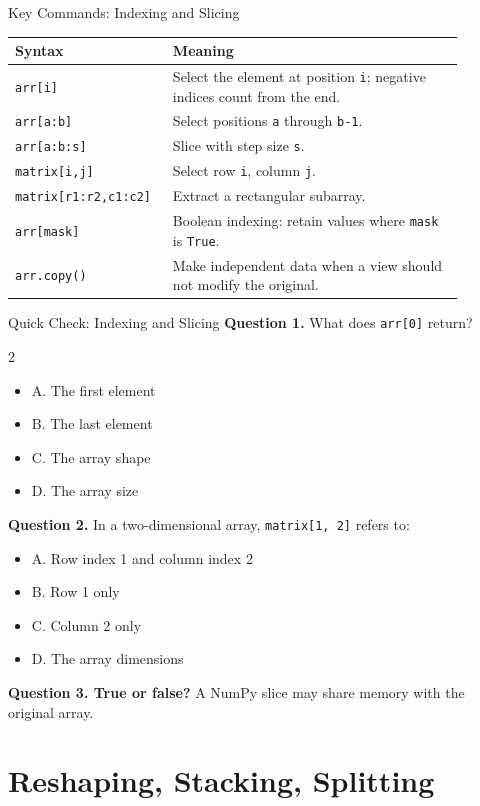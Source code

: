 \documentclass[aspectratio=169,11pt]{beamer}
\newcommand{\quiztitle}[1]{\textbf{\textcolor{QuizOrange}{#1}}}
\begin{document}
\begin{frame}{Key Commands: Indexing and Slicing}
\small
\begin{tabular}{p{0.28\linewidth}p{0.61\linewidth}}
\toprule
\textbf{Syntax} & \textbf{Meaning} \\
\midrule
\texttt{arr[i]} & Select the element at position \texttt{i}; negative indices count from the end. \\
\texttt{arr[a:b]} & Select positions \texttt{a} through \texttt{b-1}. \\
\texttt{arr[a:b:s]} & Slice with step size \texttt{s}. \\
\texttt{matrix[i,j]} & Select row \texttt{i}, column \texttt{j}. \\
\texttt{matrix[r1:r2,c1:c2]} & Extract a rectangular subarray. \\
\texttt{arr[mask]} & Boolean indexing: retain values where \texttt{mask} is \texttt{True}. \\
\texttt{arr.copy()} & Make independent data when a view should not modify the original. \\
\bottomrule
\end{tabular}
\end{frame}

\begin{frame}{Quick Check: Indexing and Slicing}
\small
\quiztitle{Question 1.} What does \texttt{arr[0]} return?
\begin{multicols}{2}
\begin{itemize}
  \item A. The first element
  \item B. The last element
  \item C. The array shape
  \item D. The array size
\end{itemize}
\end{multicols}
\quiztitle{Question 2.} In a two-dimensional array, \texttt{matrix[1, 2]} refers to:
\begin{itemize}
  \item A. Row index 1 and column index 2
  \item B. Row 1 only
  \item C. Column 2 only
  \item D. The array dimensions
\end{itemize}
\quiztitle{Question 3. True or false?} A NumPy slice may share memory with the original array.
\end{frame}

\section{Reshaping, Stacking, Splitting}
\end{document}
